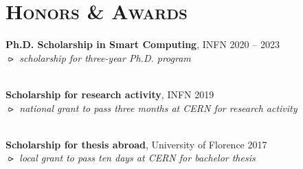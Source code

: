 \newcommand{\scholarship}[4]
  {\normalsize 
    \textbf{\color{maincolor} #1}, {\color{hlcolor-1} #2} 
    \hfill {\color{hlcolor-2} #3}\\
    {\color{iconcolor} $\rightslice$} \emph{\color{maincolor} #4}
  }


\section*{\textsc{Honors \& Awards}}
\begin{cvcontent}
  \scholarship{Ph.D. Scholarship in Smart Computing}{INFN}{2020 -- 2023}{scholarship for three-year Ph.D. program}
  \\ [2mm]
  \scholarship{Scholarship for research activity}{INFN}{2019}{national grant to pass three months at CERN for research activity}
  \\ [2mm]
  \scholarship{Scholarship for thesis abroad}{University of Florence}{2017}{local grant to pass ten days at CERN for bachelor thesis}
\end{cvcontent}